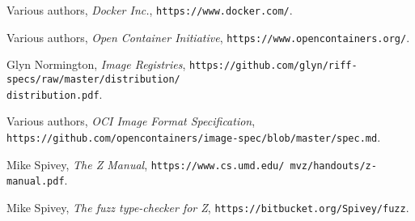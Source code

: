 \documentclass[a4paper,twoside,12pt]{article}
\begin{document}
\newpage
\begin{flushleft}
\begin{thebibliography}{99}
\label{sec:references}


  Various authors,
  \emph{Docker Inc.},
  \texttt{https://www.docker.com/}.

  Various authors,
  \emph{Open Container Initiative},
  \texttt{https://www.opencontainers.org/}.

  Glyn Normington,
  \emph{Image Registries},
  \texttt{https://github.com/glyn/riff-specs/raw/master/distribution/}\\\texttt{distribution.pdf}.

  Various authors,
  \emph{OCI Image Format Specification},
  \texttt{https://github.com/opencontainers/image-spec/blob/master/spec.md}.

  Mike Spivey,
  \emph{The Z Manual},
  \texttt{https://www.cs.umd.edu/ mvz/handouts/z-manual.pdf}.

  Mike Spivey,
  \emph{The fuzz type-checker for Z},
  \texttt{https://bitbucket.org/Spivey/fuzz}.


\end{thebibliography}
\end{flushleft}

\newpage

\end{document}
